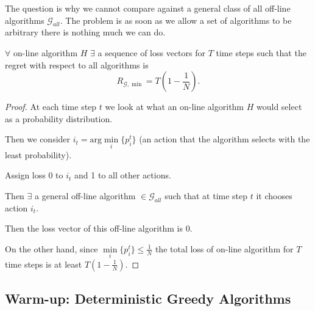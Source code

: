 The question is why we cannot compare against a general class of all off-line algorithms $\mathcal{G}_{all}$. The problem is as soon as we allow a set of algorithms to be arbitrary there is nothing much we can do.
\begin{theorem}
$\forall$ on-line algorithm $H$ $\exists$ a sequence of loss vectors for $T$ time steps such that the regret with respect to all algorithms is
$$
R_{\mathcal{G},\min}=T\left(1-\frac{1}{N}\right).
$$ 
\end{theorem}
\begin{proof}
At each time step $t$ we look at what an on-line algorithm $H$ would select as a probability distribution.

Then we consider $i_t=\text{arg}\min\limits_i\{p^t_i\}$ (an action that the algorithm selects with the least probability). 

Assign loss 0 to $i_t$ and 1 to all other actions.

Then $\exists$ a general off-line algorithm $\in\mathcal{G}_{all}$ such that at time step $t$ it chooses action $i_t$.

Then the loss vector of this off-line algorithm is 0.

On the other hand, since $\min\limits_i\{p^t_i\}\leq\frac{1}{N}$ the total loss of on-line algorithm for $T$ time steps is at least $T\left(1-\frac{1}{N}\right)$.
\end{proof}
\subsection{Warm-up: Deterministic Greedy Algorithms}
